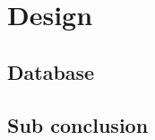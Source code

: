 \chapter{Design}
\label{chap:Design}

\section{Database}
\label{sec:Database}

\section{Sub conclusion}
\label{sec:Sub conclusion}
